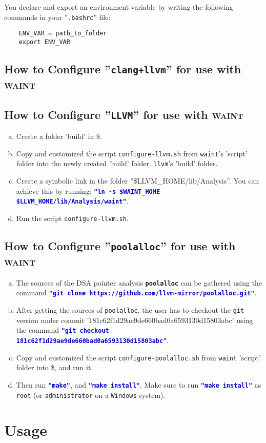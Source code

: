 \documentclass[12pt,onecolumn,a4paper]{article}
\newcommand{\softwarenov}[1]{\texttt{\textbf{#1}}\xspace}
\newcommand{\tool}[1]{\texttt{#1}\xspace}
\newcommand{\command}[1]{\textcolor{mediumblue}{\texttt{\textbf{"#1"}}}\xspace}
\newcommand{\script}[1]{\texttt{#1}\xspace}
\newcommand{\env}[1]{\textcolor{firebrickred}{\text{#1}}\xspace}
\newcommand{\envout}[1]{\textcolor{firebrickred}{\$\text{#1}}\xspace}
\begin{document}
You declare and export an environment variable \env{ENV\_VAR} by
writing the following commands in your ''\texttt{.bashrc}'' file:
\begin{verbatim}
	ENV_VAR = path_to_folder
	export ENV_VAR
\end{verbatim}

\subsection{How to Configure ''\tool{clang+llvm}'' for use with \textsc{waint}}


\subsection{How to Configure ''\tool{LLVM}'' for use with \textsc{waint}}
\begin{enumerate}[a)]
	\item Create a folder 'build' in \envout{LLVM\_HOME}.
	\item Copy and customized the script \script{configure-llvm.sh}
	from \tool{waint}'s 'script' folder into the newly created 'build' folder.
	\tool{llvm}'s 'build' folder.
	\item Create a symbolic link in the folder ''\$LLVM\_HOME/lib/Analysis''.
	You can achieve this by running: 
	\command{ln -s \$WAINT\_HOME \$LLVM\_HOME/lib/Analysis/waint}.
	\item Run the script \script{configure-llvm.sh}.
\end{enumerate}


\subsection{How to Configure ''\tool{poolalloc}'' for use with \textsc{waint}}
\begin{enumerate}[a)]
	\item The sources of the DSA pointer analysis \softwarenov{poolalloc}
	can be gathered using the command 
	\command{git clone https://github.com/llvm-mirror/poolalloc.git}.

	\item After getting the sources of \tool{poolalloc}, the user
	has to checkout the \tool{git} version under commit
	'181c62f1d29ae9de660bad0a6593130d15803abc' using the command
	\command{git checkout 181c62f1d29ae9de660bad0a6593130d15803abc}.

	\item Copy and customized the script \script{configure-poolalloc.sh}
	from \tool{waint} 'script' folder into \envout{POOLALLOC}, and
	run it.
	
	\item Then run \command{make}, and \command{make install}. Make sure
	to run \command{make install} as \texttt{root} (or \texttt{administrator}
	on a \texttt{Windows} system).
\end{enumerate}

\section{Usage}





\end{document}
